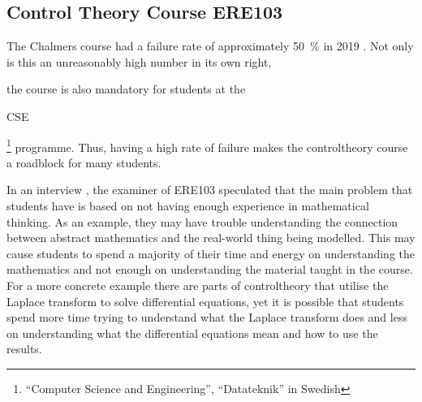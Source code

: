 \subsection{Control Theory Course ERE103}\label{backgroundERE}
The Chalmers course  had a failure rate of approximately 50~\% in 2019 \cite{ere103_minutes}. 
Not only is this an unreasonably high number in its own right,
\begin{modtext}
the course is also mandatory for students at the \begin{modtext}
CSE 
\end{modtext} \footnote{``Computer Science and Engineering'', ``Datateknik'' in Swedish} programme. Thus, having a high rate of failure makes the \gls{controltheory} course a roadblock for many students. 
\end{modtext}

\iffalse %
Sometimes students struggle with other parts than the course content itself. For example there are parts of \gls{controltheory} that utilise the Laplace transform to solve differential equations, yet it is possible that students spend more time trying to understand what the Laplace transform does and less on understanding what the differential equations mean and how to use the results. In an interview \cite{tssarbete}, the examiner of \gls{ERE103} speculated that the main problems the students have are based on not having enough experience in mathematical thinking. For example having trouble understanding the connection between abstract mathematics and the real-world thing being modelled. This may cause students to spend a majority of their time and energy on understanding the mathematics and not enough on understanding the material taught in the course.
\fi

\begin{newtext}
 In an interview \cite{tssarbete}, the examiner of \gls{ERE103} speculated that the main problem that students have is based on not having enough experience in mathematical thinking. As an example, they may have trouble understanding the connection between abstract mathematics and the real-world thing being modelled. This may cause students to spend a majority of their time and energy on understanding the mathematics and not enough on understanding the material taught in the course. For a more concrete example there are parts of \gls{controltheory} that utilise the Laplace transform to solve differential equations, yet it is possible that students spend more time trying to understand what the Laplace transform does and less on understanding what the differential equations mean and how to use the results.
 \end{newtext}

